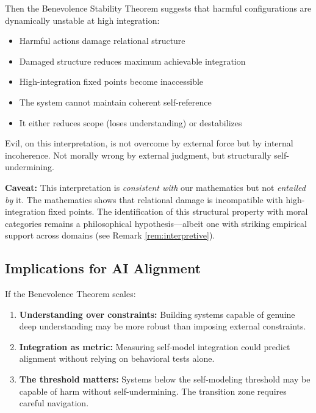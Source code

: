 \documentclass[11pt]{article}
\theoremstyle{definition}
\theoremstyle{remark}
\begin{document}
Then the Benevolence Stability Theorem suggests that harmful configurations are dynamically unstable at high integration:
\begin{itemize}
    \item Harmful actions damage relational structure
    \item Damaged structure reduces maximum achievable integration
    \item High-integration fixed points become inaccessible
    \item The system cannot maintain coherent self-reference
    \item It either reduces scope (loses understanding) or destabilizes
\end{itemize}

Evil, on this interpretation, is not overcome by external force but by internal incoherence. Not morally wrong by external judgment, but structurally self-undermining.

\textbf{Caveat:} This interpretation is \emph{consistent with} our mathematics but not \emph{entailed by} it. The mathematics shows that relational damage is incompatible with high-integration fixed points. The identification of this structural property with moral categories remains a philosophical hypothesis---albeit one with striking empirical support across domains (see Remark \ref{rem:interpretive}).

\subsection{Implications for AI Alignment}

If the Benevolence Theorem scales:

\begin{enumerate}
    \item \textbf{Understanding over constraints:} Building systems capable of genuine deep understanding may be more robust than imposing external constraints.
    
    \item \textbf{Integration as metric:} Measuring self-model integration could predict alignment without relying on behavioral tests alone.
    
    \item \textbf{The threshold matters:} Systems below the self-modeling threshold may be capable of harm without self-undermining. The transition zone requires careful navigation.
\end{enumerate}
\end{document}
